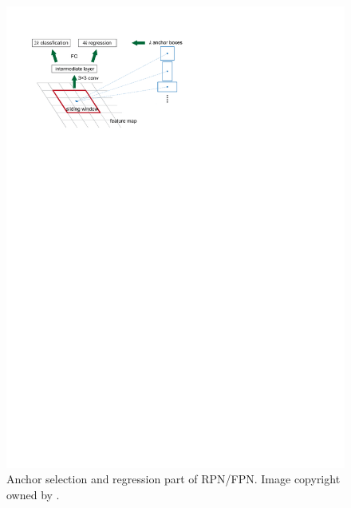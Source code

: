 \begin{figure}[!h]
	\centering
	\includegraphics[width=\figfi\textwidth]{3-11.pdf}
    \caption[Anchor selection and regression part of RPN/FPN]{Anchor selection and regression part of RPN/FPN. Image copyright owned by \cite{fasterrcnn}.}
    \label{fig:ancsel}
\end{figure}